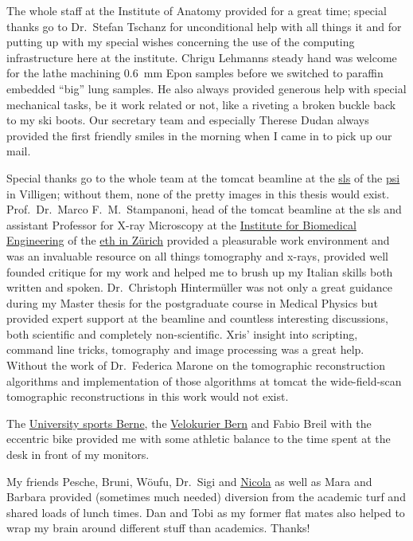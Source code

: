 The whole staff at the Institute of Anatomy provided for a great time; special thanks go to Dr.\ Stefan Tschanz for unconditional help with all things \acs{it} and for putting up with my special wishes concerning the use of the computing infrastructure here at the institute. Chrigu Lehmanns steady hand was welcome for the lathe machining \SI{0.6}{\milli\meter} Epon samples before we switched to paraffin embedded ``big'' lung samples. He also always provided generous help with special mechanical tasks, be it work related or not, \eg like a riveting a broken buckle back to my ski boots. Our secretary team and especially Therese Dudan always provided the first friendly smiles in the morning when I came in to pick up our mail.

Special thanks go to the whole team at the \acs{tomcat} beamline at the \href{http://sls.web.psi.ch/}{\acl{sls}} of the \href{http://psi.ch/}{\acl{psi}} in Villigen; without them, none of the pretty images in this thesis would exist. Prof.\ Dr.\ Marco F.\ M.\ Stampanoni, head of the \acs{tomcat} beamline at the \acl{sls} and assistant Professor for X-ray Microscopy at the \href{http://www.biomed.ee.ethz.ch/}{Institute for Biomedical Engineering} of the \href{http://ethz.ch/}{\acs{eth} in Zürich} provided a pleasurable work environment and was an invaluable resource on all things tomography and x-rays, provided well founded critique for my work and helped me to brush up my Italian skills both written and spoken. Dr.\ Christoph Hintermüller was not only a great guidance during my Master thesis for the postgraduate course in Medical Physics but provided expert support at the beamline and countless interesting discussions, both scientific and completely non-scientific. Xris' insight into scripting, command line tricks, tomography and image processing was a great help. Without the work of Dr.\ Federica Marone on the tomographic reconstruction algorithms and implementation of those algorithms at \acs{tomcat} the wide-field-scan tomographic reconstructions in this work would not exist.

The \href{http://www.sport.unibe.ch/}{University sports Berne}, the \href{http://velokurierbern.ch/}{Velokurier Bern} and Fabio Breil with the eccentric bike provided me with some athletic balance to the time spent at the desk in front of my monitors.

My friends Pesche, Bruni, Wöufu, Dr.\ Sigi and \href{http://www.nicolafrombern.com/}{Nicola} as well as Mara and Barbara provided (sometimes much needed) diversion from the academic turf and shared loads of lunch times. Dan and Tobi as my former flat mates also helped to wrap my brain around different stuff than academics. Thanks!

